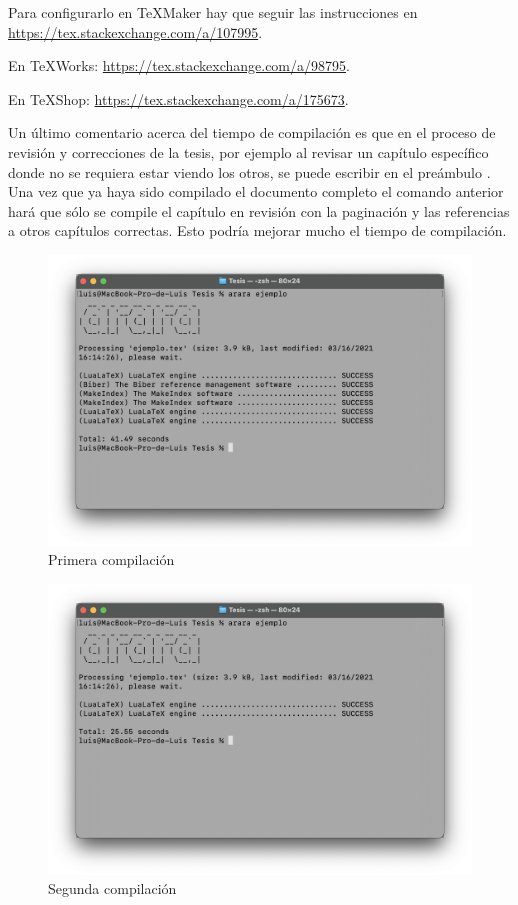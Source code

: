 Para configurarlo en TeXMaker hay que seguir las instrucciones en
\url{https://tex.stackexchange.com/a/107995}.

En TeXWorks: \url{https://tex.stackexchange.com/a/98795}.

En TeXShop: \url{https://tex.stackexchange.com/a/175673}.

Un último comentario acerca del tiempo de compilación es que en el proceso
de revisión y correcciones de la tesis, por ejemplo al revisar un capítulo
específico donde no se requiera estar viendo los otros, se puede escribir en
el preámbulo \verb||. Una vez que ya haya
sido compilado el documento completo el comando anterior hará que sólo se
compile el capítulo en revisión con la paginación y las referencias a otros
capítulos correctas. Esto podría mejorar mucho el tiempo de compilación.

\begin{figure}
\centering
  \includegraphics[scale=0.3]{primera}
  \caption{Primera compilación}
\end{figure}

\begin{figure}
\centering
  \includegraphics[scale=0.3]{segunda}
  \caption{Segunda compilación}
\end{figure}
